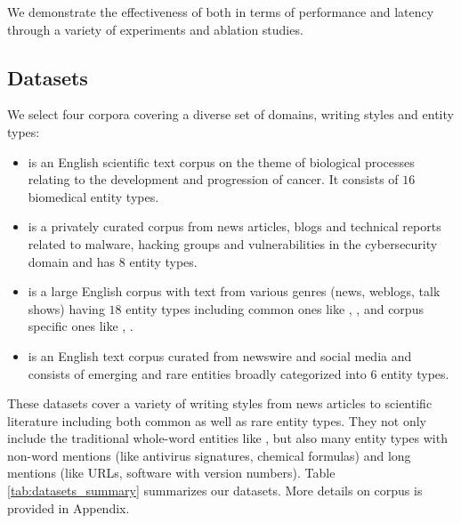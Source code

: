 We demonstrate the effectiveness of \modelname{} both in terms of performance and latency through a variety of experiments and ablation studies.

\subsection{Datasets}
We select four corpora covering a diverse set of domains, writing styles and entity types:

\begin{itemize}

    \item {} \cite{pyysalo2015overview} is an English scientific text corpus on the theme of biological processes relating to the development and progression of cancer. It consists of $16$ biomedical entity types.
    
    \item {} is a privately curated corpus from news articles, blogs and technical reports related to malware, hacking groups and vulnerabilities in the cybersecurity domain and has $8$ entity types.
    
    \item {} \cite{weischedel2013ontonotes} is a large English corpus with text from various genres (news, weblogs, talk shows) having $18$ entity types including common ones like , ,  and corpus specific ones like , .
    
    \item {} \cite{derczynski2017results} is an English text corpus curated from newswire and social media and consists of emerging and rare entities broadly categorized into $6$ entity types.
    
\end{itemize}

These datasets cover a variety of writing styles from news articles to scientific literature including both common as well as rare entity types. They not only include the traditional whole-word entities like ,  but also many entity types with non-word mentions (like antivirus signatures, chemical formulas) and long mentions (like URLs, software with version numbers). Table \ref{tab:datasets_summary} summarizes our datasets. More details on  corpus is provided in Appendix.

